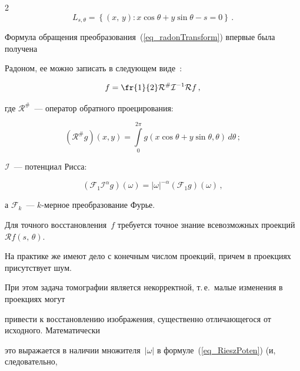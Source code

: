 \begin{multicols}{2}
\begin{equation*}
L_{s,\theta}=\left\{ (x,\,y): x\cos\theta+y\sin\theta-s=0 \right \}\,.


\end{equation*}


Формула обращения преобразования~(\ref{eq_radonTransform}) впервые была получена 


Радоном, ее можно записать в следующем виде~\cite{Natterer}:


\begin{equation}


\label{eq_radonInverse}


f = \fr{1}{2}\mathcal{R}^{\#}\mathcal{I}^{-1}\mathcal{R}f\,,


\end{equation}


где $\mathcal{R^{\#}}$~--- оператор обратного проецирования:


\begin{equation*}


\left(\mathcal{R^{\#}}g\right)(x,y)=\int\limits_0^{2\pi}g(x\cos\theta+y\sin\theta,\theta)\,d\theta\,;


\end{equation*}


$\mathcal{I}$~--- потенциал Рисса:


\begin{equation}


\label{eq_RieszPoten}


\left(\mathcal{F}_1\mathcal{I}^\alpha g\right) (\omega) = |\omega|^{-\alpha}\left(\mathcal{F}_1 g\right)(\omega)\,,


\end{equation}


а $\mathcal{F}_k$~--- $k$-мерное преобразование Фурье.





Для точного восстановления~$f$ требуется точное знание всевозможных проекций~$\mathcal{R}f(s,\,\theta)$. 


На практике же имеют дело с конечным числом проекций, причем в проекциях присутствует шум.


При этом задача томографии является некорректной, т.\,е.\ малые изменения в проекциях могут 


при\-вес\-ти к восстановлению изображения, существенно отличающегося от исходного. Математически


это выражается в наличии множителя~$|\omega|$ в формуле~(\ref{eq_RieszPoten}) (и, следовательно, 



\end{multicols}

